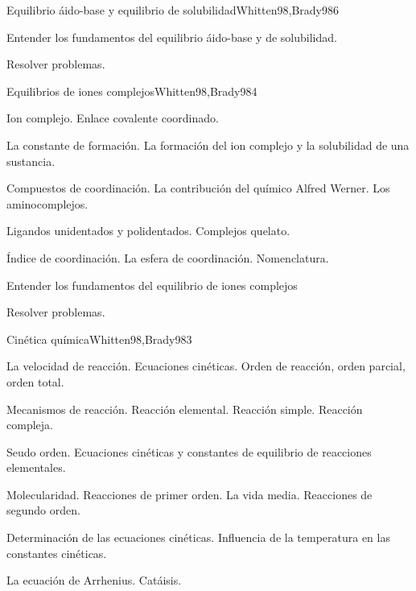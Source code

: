 \begin{syllabus}
\begin{unit}{Equilibrio áido-base y equilibrio de solubilidad}{Whitten98,Brady98}{6}
\begin{unitgoals}
	\item Entender los fundamentos del equilibrio áido-base y de solubilidad.
	\item Resolver problemas.
\end{unitgoals}
\end{unit}

\begin{unit}{Equilibrios de iones complejos}{Whitten98,Brady98}{4}
\begin{topics}
	\item Ion complejo. Enlace covalente coordinado.
	\item La constante de formación. La formación del ion complejo y la solubilidad de una sustancia.
	\item Compuestos de coordinación. La contribución del químico Alfred Werner. Los aminocomplejos.
	\item Ligandos unidentados y polidentados. Complejos quelato.
	\item Índice de coordinación. La esfera de coordinación. Nomenclatura.
   \end{topics}

   \begin{unitgoals}
      \item Entender los fundamentos del equilibrio de iones complejos
      \item Resolver problemas.
   \end{unitgoals}
\end{unit}

\begin{unit}{Cinética química}{Whitten98,Brady98}{3}
\begin{topics}
      \item La velocidad de  reacción. Ecuaciones cinéticas. Orden de reacción, orden parcial, orden total.
      \item Mecanismos de reacción. Reacción elemental. Reacción simple. Reacción compleja.
	\item Seudo orden. Ecuaciones cinéticas y constantes de equilibrio de reacciones elementales.
	\item Molecularidad. Reacciones de primer orden. La vida media. Reacciones de segundo orden.
	\item Determinación de las ecuaciones cinéticas. Influencia de la temperatura en las constantes cinéticas.
	\item La ecuación de Arrhenius. Catáisis.
  \end{topics}


\end{unit}
\end{syllabus}
